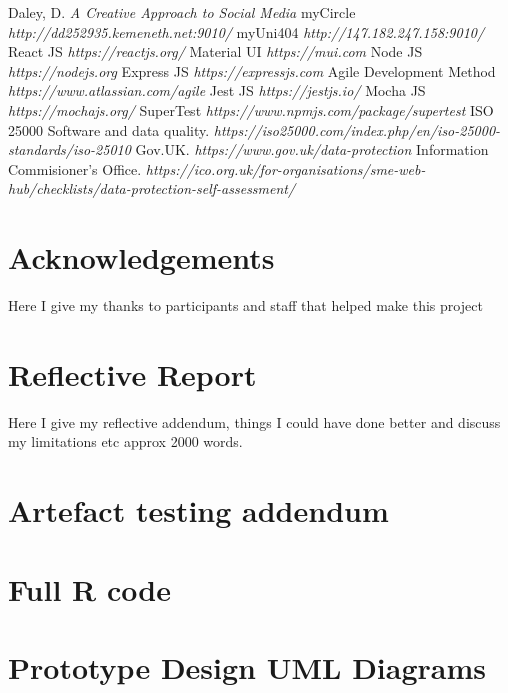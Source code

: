 \documentclass[lettersize,journal]{IEEEtran}
\begin{document}
\begin{thebibliography}{}
        Daley, D. {\it{A Creative Approach to Social Media}}
        myCircle
        {\it{http://dd252935.kemeneth.net:9010/}}
    myUni404
    {\it{http://147.182.247.158:9010/}}
        React JS
        {\it{https://reactjs.org/}}
        Material UI
        {\it{https://mui.com}}
        Node JS
        {\it{https://nodejs.org}}
        Express JS
        {\it{https://expressjs.com}}
        Agile Development Method
        {\it{https://www.atlassian.com/agile}}
        Jest JS
        {\it{https://jestjs.io/}}
        Mocha JS
        {\it{https://mochajs.org/}}
        SuperTest
        {\it{https://www.npmjs.com/package/supertest}}
        ISO 25000 Software and data quality.
        {\it{https://iso25000.com/index.php/en/iso-25000-standards/iso-25010}}
        Gov.UK. {\it{https://www.gov.uk/data-protection}}
        Information Commisioner's Office. {\it{https://ico.org.uk/for-organisations/sme-web-hub/checklists/data-protection-self-assessment/}}

\end{thebibliography}

\appendices
\newpage
\section{Acknowledgements}
Here I give my thanks to participants and staff that helped make this project


\section{Reflective Report}
        Here I give my reflective addendum, things I could have done better and discuss my limitations etc approx 2000 words.


\section{Artefact testing addendum}


\section{Full R code}
\newpage
\onecolumn
\section{{Prototype Design UML Diagrams}}
\end{document}
